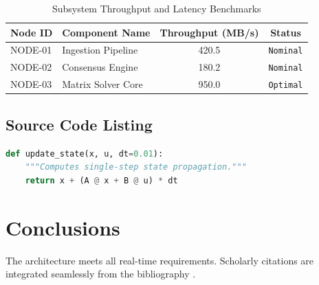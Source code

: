 \documentclass[11pt, a4paper]{report}
\begin{document}
\begin{table}[h]
    \centering
    \caption{Subsystem Throughput and Latency Benchmarks}
    \begin{tabular}{llcc}
        \toprule
        \textbf{Node ID} & \textbf{Component Name} & \textbf{Throughput (MB/s)} & \textbf{Status} \\
        \midrule
        NODE-01 & Ingestion Pipeline       & 420.5 & \texttt{Nominal} \\
        NODE-02 & Consensus Engine        & 180.2 & \texttt{Nominal} \\
        NODE-03 & Matrix Solver Core       & 950.0 & \texttt{Optimal} \\
        \bottomrule
    \end{tabular}
\end{table}

\section{Source Code Listing}
\begin{lstlisting}[language=Python, caption={Consensus update step loop.}]
def update_state(x, u, dt=0.01):
    """Computes single-step state propagation."""
    return x + (A @ x + B @ u) * dt
\end{lstlisting}

\chapter{Conclusions}
The architecture meets all real-time requirements. Scholarly citations are integrated seamlessly from the bibliography \cite{ieee_evans, ieee_ramirez}.



\end{document}
